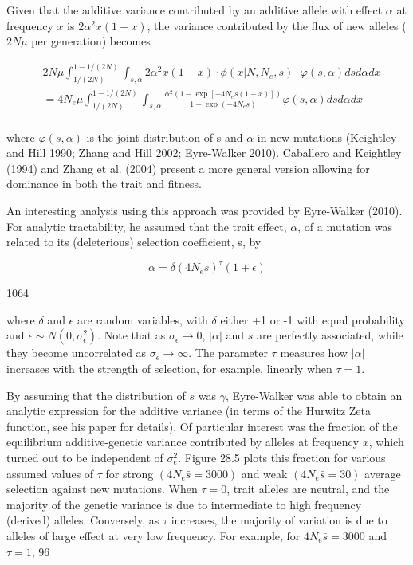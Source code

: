 \documentclass{article}
\begin{document}
Given that the additive variance contributed by an additive allele with effect  $ \alpha $ at frequency  $ x $ is  $ 2\alpha^2x(1 - x) $, the variance contributed by the flux of new alleles ( $ 2N\mu $ per generation) becomes

\begin{equation}
\begin{aligned}&2N\mu\int_{1/(2N)}^{1-1/(2N)}\int_{s,\alpha}2\alpha^{2}x(1-x)\cdot\phi(x|N,N_{e},s)\cdot\varphi(s,\alpha)ds d\alpha dx\\ &=4N_{e}\mu\int_{1/(2N)}^{1-1/(2N)}\int_{s,\alpha}\frac{\alpha^{2}(1-\exp[-4N_{e}s(1-x)])}{1-\exp(-4N_{e}s)}\varphi(s,\alpha)ds d\alpha dx\\ \end{aligned}
\end{equation}

where  $ \varphi(s, \alpha) $ is the joint distribution of s and  $ \alpha $ in new mutations (Keightley and Hill 1990; Zhang and Hill 2002; Eyre-Walker 2010). Caballero and Keightley (1994) and Zhang et al. (2004) present a more general version allowing for dominance in both the trait and fitness.

An interesting analysis using this approach was provided by Eyre-Walker (2010). For analytic tractability, he assumed that the trait effect,  $ \alpha $, of a mutation was related to its (deleterious) selection coefficient, s, by

\begin{equation}
\alpha=\delta(4N_{e}s)^{\tau}(1+\epsilon)
\end{equation}

1064

where $\delta$ and $\epsilon$ are random variables, with $\delta$ either +1 or -1 with equal probability and $\epsilon \sim N(0, \sigma_{\epsilon}^2)$. Note that as $\sigma_{\epsilon} \to 0$, $|\alpha|$ and $s$ are perfectly associated, while they become uncorrelated as $\sigma_{\epsilon} \to \infty$. The parameter $\tau$ measures how $|\alpha|$ increases with the strength of selection, for example, linearly when $\tau = 1$.

By assuming that the distribution of $s$ was $\gamma$, Eyre-Walker was able to obtain an analytic expression for the additive variance (in terms of the Hurwitz Zeta function, see his paper for details). Of particular interest was the fraction of the equilibrium additive-genetic variance contributed by alleles at frequency $x$, which turned out to be independent of $\sigma_e^2$. Figure 28.5 plots this fraction for various assumed values of $\tau$ for strong $(4N_e\bar{s}=3000)$ and weak $(4N_e\bar{s}=30)$ average selection against new mutations. When $\tau=0$, trait alleles are neutral, and the majority of the genetic variance is due to intermediate to high frequency (derived) alleles. Conversely, as $\tau$ increases, the majority of variation is due to alleles of large effect at very low frequency. For example, for $4N_e\bar{s}=3000$ and $\tau=1$, 96%
\end{document}
